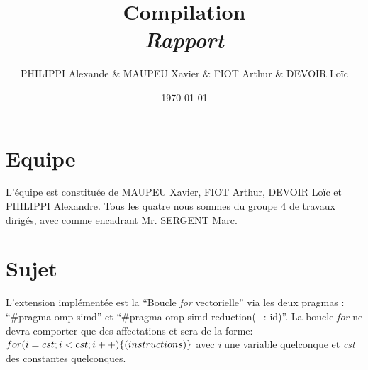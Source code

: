 \documentclass[a4paper,8pt,french,fleqn]{report}
\title{\textbf{Compilation}\\\textit{Rapport}}
\author{PHILIPPI Alexande \& MAUPEU Xavier \& FIOT Arthur \& DEVOIR Loïc}
\date{\today}
\begin{document}
\maketitle

\newpage

\section*{Equipe}

L'équipe est constituée de MAUPEU Xavier, FIOT Arthur, DEVOIR Loïc et PHILIPPI Alexandre. Tous les quatre nous sommes du groupe 4 de travaux dirigés, avec comme encadrant Mr. SERGENT Marc.

\section*{Sujet}

L'extension implémentée est la ``Boucle \textit{for} vectorielle'' via les deux pragmas : ``\#pragma omp simd'' et ``\#pragma omp simd reduction(+: id)''.
La boucle \textit{for} ne devra comporter que des affectations et sera de la forme:\\
$for (i=cst ; i<cst ;i++) \{ \\
(instructions) \\
\}\\$
avec \textit{i} une variable quelconque et \textit{cst} des constantes quelconques.
\end{document}
